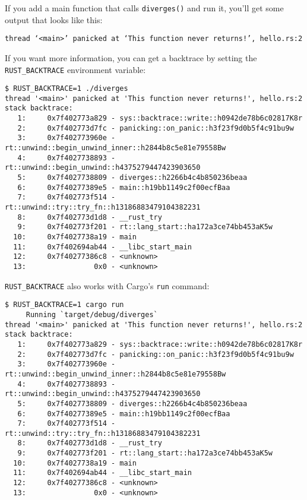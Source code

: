 \documentclass[a4paper,]{book}
\begin{document}
If you add a main function that calls \texttt{diverges()} and run it,
you'll get some output that looks like this:

\begin{verbatim}
thread ‘<main>’ panicked at ‘This function never returns!’, hello.rs:2
\end{verbatim}

If you want more information, you can get a backtrace by setting the
\texttt{RUST\_BACKTRACE} environment variable:

\begin{verbatim}
$ RUST_BACKTRACE=1 ./diverges
thread '<main>' panicked at 'This function never returns!', hello.rs:2
stack backtrace:
   1:     0x7f402773a829 - sys::backtrace::write::h0942de78b6c02817K8r
   2:     0x7f402773d7fc - panicking::on_panic::h3f23f9d0b5f4c91bu9w
   3:     0x7f402773960e - rt::unwind::begin_unwind_inner::h2844b8c5e81e79558Bw
   4:     0x7f4027738893 - rt::unwind::begin_unwind::h4375279447423903650
   5:     0x7f4027738809 - diverges::h2266b4c4b850236beaa
   6:     0x7f40277389e5 - main::h19bb1149c2f00ecfBaa
   7:     0x7f402773f514 - rt::unwind::try::try_fn::h13186883479104382231
   8:     0x7f402773d1d8 - __rust_try
   9:     0x7f402773f201 - rt::lang_start::ha172a3ce74bb453aK5w
  10:     0x7f4027738a19 - main
  11:     0x7f402694ab44 - __libc_start_main
  12:     0x7f40277386c8 - <unknown>
  13:                0x0 - <unknown>
\end{verbatim}

\texttt{RUST\_BACKTRACE} also works with Cargo's \texttt{run} command:

\begin{verbatim}
$ RUST_BACKTRACE=1 cargo run
     Running `target/debug/diverges`
thread '<main>' panicked at 'This function never returns!', hello.rs:2
stack backtrace:
   1:     0x7f402773a829 - sys::backtrace::write::h0942de78b6c02817K8r
   2:     0x7f402773d7fc - panicking::on_panic::h3f23f9d0b5f4c91bu9w
   3:     0x7f402773960e - rt::unwind::begin_unwind_inner::h2844b8c5e81e79558Bw
   4:     0x7f4027738893 - rt::unwind::begin_unwind::h4375279447423903650
   5:     0x7f4027738809 - diverges::h2266b4c4b850236beaa
   6:     0x7f40277389e5 - main::h19bb1149c2f00ecfBaa
   7:     0x7f402773f514 - rt::unwind::try::try_fn::h13186883479104382231
   8:     0x7f402773d1d8 - __rust_try
   9:     0x7f402773f201 - rt::lang_start::ha172a3ce74bb453aK5w
  10:     0x7f4027738a19 - main
  11:     0x7f402694ab44 - __libc_start_main
  12:     0x7f40277386c8 - <unknown>
  13:                0x0 - <unknown>
\end{verbatim}
\end{document}

